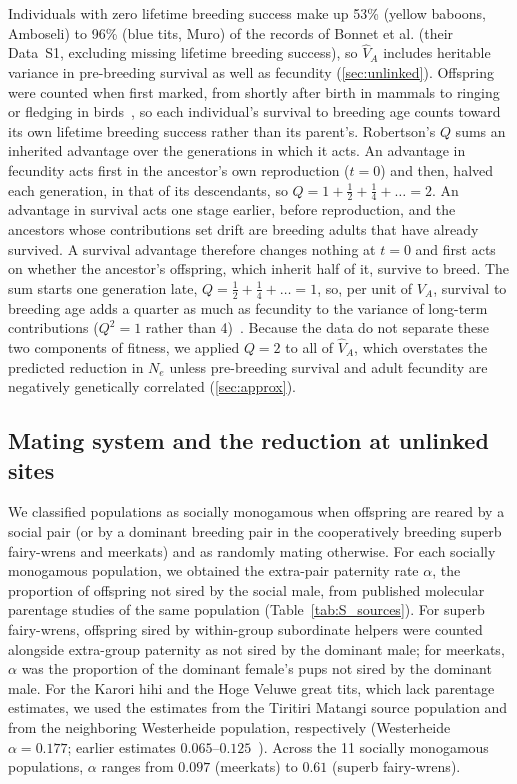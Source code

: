 \documentclass{article}
\begin{document}
Individuals with zero lifetime breeding success make up 53\% (yellow baboons, Amboseli) to 96\% (blue tits, Muro) of the records of Bonnet et al. (their Data~S1, excluding missing lifetime breeding success), so $\hat{V}_A$ includes heritable variance in pre-breeding survival as well as fecundity (\autoref{sec:unlinked}). Offspring were counted when first marked, from shortly after birth in mammals to ringing or fledging in birds~\cite{bonnet2022}, so each individual's survival to breeding age counts toward its own lifetime breeding success rather than its parent's. Robertson's $Q$ sums an inherited advantage over the generations in which it acts. An advantage in fecundity acts first in the ancestor's own reproduction ($t = 0$) and then, halved each generation, in that of its descendants, so $Q = 1 + \tfrac12 + \tfrac14 + \dots = 2$. An advantage in survival acts one stage earlier, before reproduction, and the ancestors whose contributions set drift are breeding adults that have already survived. A survival advantage therefore changes nothing at $t = 0$ and first acts on whether the ancestor's offspring, which inherit half of it, survive to breed. The sum starts one generation late, $Q = \tfrac12 + \tfrac14 + \dots = 1$, so, per unit of $V_A$, survival to breeding age adds a quarter as much as fecundity to the variance of long-term contributions ($Q^2 = 1$ rather than 4)~\cite{robertson1961,santiago1995}. Because the data do not separate these two components of fitness, we applied $Q = 2$ to all of $\hat{V}_A$, which overstates the predicted reduction in $N_e$ unless pre-breeding survival and adult fecundity are negatively genetically correlated (\autoref{sec:approx}).

\subsection{Mating system and the reduction at unlinked sites}\label{sec:meth_mating}
We classified populations as socially monogamous when offspring are reared by a social pair (or by a dominant breeding pair in the cooperatively breeding superb fairy-wrens and meerkats) and as randomly mating otherwise. For each socially monogamous population, we obtained the extra-pair paternity rate $\alpha$, the proportion of offspring not sired by the social male, from published molecular parentage studies of the same population (Table~\ref{tab:S_sources}). For superb fairy-wrens, offspring sired by within-group subordinate helpers were counted alongside extra-group paternity as not sired by the dominant male; for meerkats, $\alpha$ was the proportion of the dominant female's pups not sired by the dominant male. For the Karori hihi and the Hoge Veluwe great tits, which lack parentage estimates, we used the estimates from the Tiritiri Matangi source population and from the neighboring Westerheide population, respectively (Westerheide $\alpha = 0.177$; earlier estimates $0.065$--$0.125$~\cite{vanoers2008}). Across the 11 socially monogamous populations, $\alpha$ ranges from $0.097$ (meerkats) to $0.61$ (superb fairy-wrens).
\end{document}
